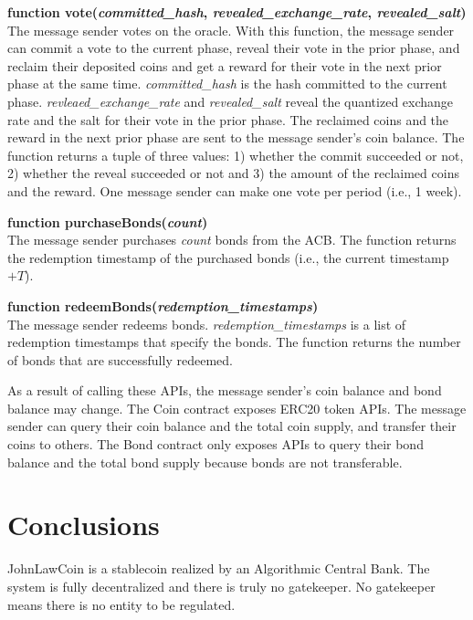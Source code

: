 \documentclass[dvipdfmx,a4paper]{article}
\begin{document}
\begin{description}
\item{\textbf{function vote(\textit{committed\_hash}, \textit{revealed\_exchange\_rate}, \textit{revealed\_salt})}}\\
The message sender votes on the oracle. With this function, the message sender can commit a vote to the current phase, reveal their vote in the prior phase, and reclaim their deposited coins and get a reward for their vote in the next prior phase at the same time. \textit{committed\_hash} is the hash committed to the current phase. \textit{revleaed\_exchange\_rate} and \textit{revealed\_salt} reveal the quantized exchange rate and the salt for their vote in the prior phase. The reclaimed coins and the reward in the next prior phase are sent to the message sender's coin balance. The function returns a tuple of three values: 1) whether the commit succeeded or not, 2) whether the reveal succeeded or not and 3) the amount of the reclaimed coins and the reward. One message sender can make one vote per period (i.e., 1 week).
\item{\textbf{function purchaseBonds(\textit{count})}}\\
The message sender purchases \textit{count} bonds from the ACB. The function returns the redemption timestamp of the purchased bonds (i.e., the current timestamp $+T$).
\item{\textbf{function redeemBonds(\textit{redemption\_timestamps})}}\\
The message sender redeems bonds. \textit{redemption\_timestamps} is a list of redemption timestamps that specify the bonds. The function returns the number of bonds that are successfully redeemed.
\end{description}

As a result of calling these APIs, the message sender's coin balance and bond balance may change. The Coin contract exposes ERC20 token APIs. The message sender can query their coin balance and the total coin supply, and transfer their coins to others. The Bond contract only exposes APIs to query their bond balance and the total bond supply because bonds are not transferable.

\section{Conclusions}

JohnLawCoin is a stablecoin realized by an Algorithmic Central Bank. The system is fully decentralized and there is truly no gatekeeper. No gatekeeper means there is no entity to be regulated.
\end{document}
